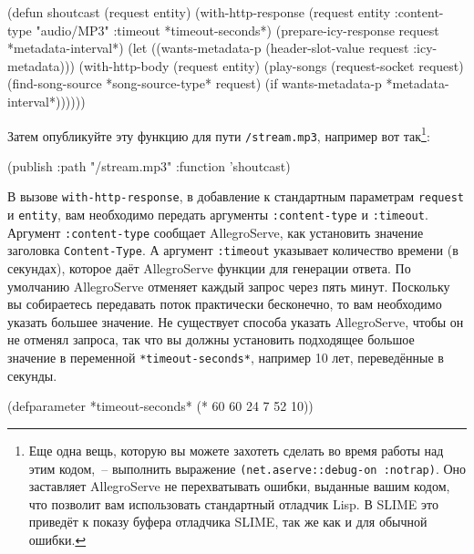 \begin{myverb}
(defun shoutcast (request entity)
  (with-http-response
      (request entity :content-type "audio/MP3" :timeout *timeout-seconds*)
    (prepare-icy-response request *metadata-interval*)
    (let ((wants-metadata-p (header-slot-value request :icy-metadata)))
      (with-http-body (request entity)
        (play-songs 
         (request-socket request)
         (find-song-source *song-source-type* request)
         (if wants-metadata-p *metadata-interval*))))))
\end{myverb}

Затем опубликуйте эту функцию для пути \lstinline{/stream.mp3}, например вот так\footnote{Еще
  одна вещь, которую вы можете захотеть сделать во время работы над этим кодом,~--
  выполнить выражение \lstinline{(net.aserve::debug-on :notrap)}.  Оно заставляет AllegroServe
  не перехватывать ошибки, выданные вашим кодом, что позволит вам использовать стандартный
  отладчик Lisp.  В SLIME это приведёт к показу буфера отладчика SLIME, так же как и для
  обычной ошибки.}:

\begin{myverb}
(publish :path "/stream.mp3" :function 'shoutcast)
\end{myverb}

В вызове \lstinline{with-http-response}, в добавление к стандартным параметрам \lstinline{request} и
\lstinline{entity}, вам необходимо передать аргументы \lstinline{:content-type} и \lstinline{:timeout}.
Аргумент \lstinline{:content-type} сообщает AllegroServe, как установить значение заголовка
\lstinline{Content-Type}.  А аргумент \lstinline{:timeout} указывает количество времени (в
секундах), которое даёт AllegroServe функции для генерации ответа. По умолчанию
AllegroServe отменяет каждый запрос через пять минут.  Поскольку вы собираетесь передавать
поток практически бесконечно, то вам необходимо указать большее значение.  Не существует
способа указать AllegroServe, чтобы он не отменял запроса, так что вы должны установить
подходящее большое значение в переменной \lstinline{*timeout-seconds*}, например 10 лет,
переведённые в секунды.

\begin{myverb}
(defparameter *timeout-seconds* (* 60 60 24 7 52 10))
\end{myverb}

